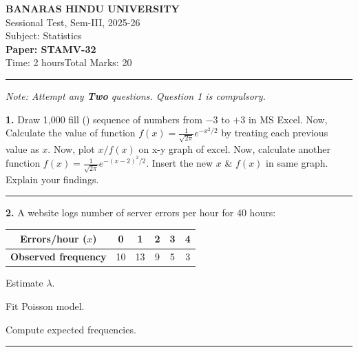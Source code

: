 \documentclass[11pt,a4paper]{article}
\begin{document}
\begin{center}
  {\large\bfseries BANARAS HINDU UNIVERSITY}\\[2pt]
  {\normalsize Sessional Test, Sem-III, 2025-26}\\[4pt]
  {\normalsize Subject: Statistics}\\[4pt]
  {\large\bfseries Paper: STAMV-32}\\[4pt]
  {\normalsize Time: 2 hours\hfill Total Marks: 20}
\end{center}

\rule{\linewidth}{0.4pt}

\smallskip



\noindent   \textit{Note: Attempt any   \textbf{Two} questions. Question 1 is compulsory.}

\bigskip




\noindent   \textbf{1.} Draw 1,000 fill () sequence of numbers from $-3$ to $+3$ in MS Excel. Now, Calculate the value of function $f(x) = \frac{1}{\sqrt{2\pi}} e^{-x^2/2}$ by treating each previous value as $x$. Now, plot $x/f(x)$ on x-y graph of excel. Now, calculate another function $f(x) = \frac{1}{\sqrt{2\pi}} e^{-(x-2)^2/2}$. Insert the new $x$ \& $f(x)$ in same graph. Explain your findings.

\medskip\rule{\linewidth}{0.2pt}\medskip




\noindent   \textbf{2.} A website logs number of server errors per hour for 40 hours:

\begin{center}

\begin{tabular}{|c|c|c|c|c|c|}
\hline
   \textbf{Errors/hour ($x$)} & 0 & 1 & 2 & 3 & 4 \\
\hline
   \textbf{Observed frequency} & 10 & 13 & 9 & 5 & 3 \\
\hline
\end{tabular}
\end{center}

\begin{parts}
  \item Estimate $\lambda$.
  \item Fit Poisson model.
  \item Compute expected frequencies.
\end{parts}

\medskip\rule{\linewidth}{0.2pt}\medskip
\end{document}
